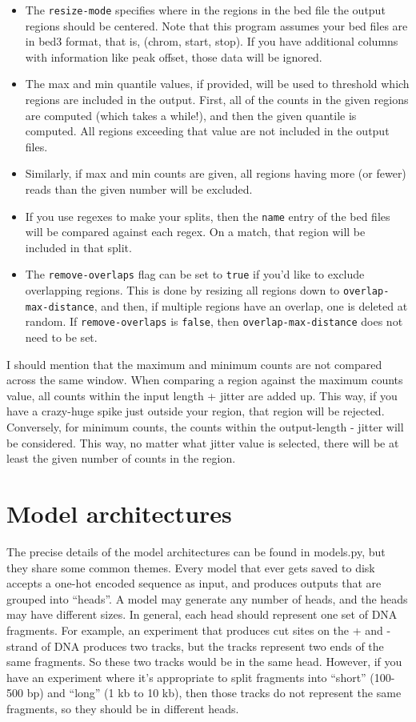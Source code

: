 \documentclass{article}
\begin{document}
\begin{itemize}
    \item The \texttt{resize-mode} specifies where in the regions in the bed file the output regions should be centered. Note that this program assumes your bed files are in bed3 format, that is, (chrom, start, stop). If you have additional columns with information like peak offset, those data will be ignored.
    \item The max and min quantile values, if provided, will be used to threshold which regions are included in the output. First, all of the counts in the given regions are computed (which takes a while!), and then the given quantile is computed. All regions exceeding that value are not included in the output files.
    \item Similarly, if max and min counts are given, all regions having more (or fewer) reads than the given number will be excluded.
    \item If you use regexes to make your splits, then the \texttt{name} entry of the bed files will be compared against each regex. On a match, that region will be included in that split.
    \item The \texttt{remove-overlaps} flag can be set to \texttt{true} if you'd like to exclude overlapping regions. This is done by resizing all regions down to \texttt{overlap-max-distance}, and then, if multiple regions have an overlap, one is deleted at random. If \texttt{remove-overlaps} is \texttt{false}, then \texttt{overlap-max-distance} does not need to be set.
\end{itemize}

I should mention that the maximum and minimum counts are not compared across the same window.
When comparing a region against the maximum counts value, all counts within the input length + jitter are added up. This way, if you have a crazy-huge spike just outside your region, that region will be rejected.
Conversely, for minimum counts, the counts within the output-length - jitter will be considered. This way, no matter what jitter value is selected, there will be at least the given number of counts in the region.


\newpage
\section{Model architectures}\label{sec:modelArchitectures}

The precise details of the model architectures can be found in models.py, but they share some common themes.
Every model that ever gets saved to disk accepts a one-hot encoded sequence as input, and produces outputs that are grouped into ``heads''.
A model may generate any number of heads, and the heads may have different sizes.
In general, each head should represent one set of DNA fragments. For example, an experiment that produces cut sites on the + and - strand of DNA produces
two tracks, but the tracks represent two ends of the same fragments. So these two tracks would be in the same head.
However, if you have an experiment where it's appropriate to split fragments into ``short'' (100-500 bp) and ``long'' (1 kb to 10 kb), then
those tracks do not represent the same fragments, so they should be in different heads.
\end{document}
